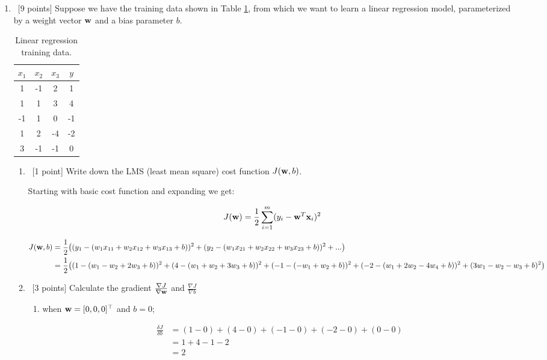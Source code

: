 \documentclass[12pt, fullpage,letterpaper]{article}
\begin{document}
\begin{enumerate}
\item~[9 points] Suppose we have the training data shown in Table \ref{tb:1}, from which we want to learn a linear regression model, parameterized by a weight vector ${\bf w}$ and a bias parameter $b$.  
\begin{table}
	\centering
	\begin{tabular}{ccc|c}
		$x_1 $ & $x_2$ & $x_3$ &  $y$\\ 
		\hline\hline
		1 & -1 & 2 & 1 \\ \hline
		1 & 1 & 3 & 4 \\ \hline
		-1 & 1 & 0 & -1 \\ \hline
		1 & 2 & -4 & -2 \\ \hline
		3 & -1 & -1 & 0\\ \hline
	\end{tabular}
	\caption{Linear regression training data.}\label{tb:1}
\end{table}

\begin{enumerate}
	\item~[1 point] Write down the LMS (least mean square) cost function $J({\bf w}, b)$. 
	
	Starting with basic cost function and expanding we get:
	
	\[
		\begin{split}
			J({\bf w}) = \frac{1}{2} \sum_{i=1}^m (y_i - {\bf w}^T{\bf x}_i)^2
		\end{split}
	\] 
	
	\[
		\begin{split}
			J({\bf w}, b) &= \frac{1}{2} \big(  (y_1 - (w_1x_{11} + w_2x_{12} + w_3x_{13} + b))^2 + (y_2 - (w_1x_{21} + w_2x_{22} + w_3x_{23} + b))^2 + ... \big)\\
			&= \frac{1}{2} \big((1-(w_1-w_2+2w_3+b))^2+(4-(w_1+w_2+3w_3+b))^2+(-1-(-w_1+w_2+b))^2+(-2-(w_1+2w_2-4w_4+b))^2+(3w_1-w_2-w_3+b)^2   \big)
		\end{split}
	\]
	
	
	\item~[3 points] Calculate the gradient $\frac{\nabla J}{\nabla {\bf w}}$ and $\frac{\nabla J}{\nabla b}$ 
	\begin{enumerate}
		\item when ${\bf w} = [0,0,0]^\top$ and $b = 0$;
		
		\[
			\begin{split}
				\frac{\delta J}{\delta b} &= (1-0) + (4-0) + (-1-0) + (-2-0)+ (0-0)\\
					&= 1 + 4 - 1 - 2\\
					&= 2
			\end{split}
		\]
		

\end{enumerate}
\end{enumerate}
\end{enumerate}
\end{document}
